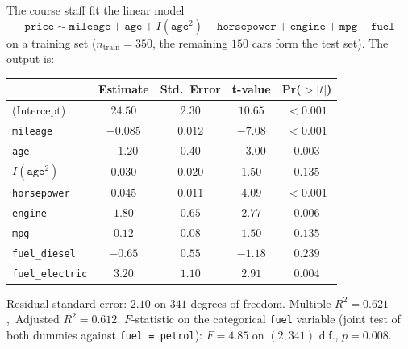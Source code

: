 \documentclass[11pt,a4paper]{article}
\begin{document}
The course staff fit the linear model
$$\texttt{price} \sim \texttt{mileage} + \texttt{age} + I(\texttt{age}^2) + \texttt{horsepower} + \texttt{engine} + \texttt{mpg} + \texttt{fuel}$$
on a training set ($n_\text{train} = 350$, the remaining $150$ cars form the test set). The output is:

\begin{center}\small
\begin{tabular}{lcccc}
\toprule
 & \textbf{Estimate} & \textbf{Std.\ Error} & \textbf{t-value} & \textbf{Pr($>|t|$)} \\
\midrule
(Intercept)    & $24.50$  & $2.30$    & $10.65$  & $<0.001$ \\
\texttt{mileage}        & $-0.085$ & $0.012$   & $-7.08$  & $<0.001$ \\
\texttt{age}            & $-1.20$  & $0.40$    & $-3.00$  & $0.003$ \\
$I(\texttt{age}^2)$     & $0.030$  & $0.020$   & $1.50$   & $0.135$ \\
\texttt{horsepower}     & $0.045$  & $0.011$   & $4.09$   & $<0.001$ \\
\texttt{engine}         & $1.80$   & $0.65$    & $2.77$   & $0.006$ \\
\texttt{mpg}            & $0.12$   & $0.08$    & $1.50$   & $0.135$ \\
\texttt{fuel\_diesel}   & $-0.65$  & $0.55$    & $-1.18$  & $0.239$ \\
\texttt{fuel\_electric} & $3.20$   & $1.10$    & $2.91$   & $0.004$ \\
\bottomrule
\end{tabular}
\end{center}

\noindent Residual standard error: $2.10$ on $341$ degrees of freedom.\quad
Multiple $R^2 = 0.621$,\ Adjusted $R^2 = 0.612$.\quad
$F$-statistic on the categorical \texttt{fuel} variable (joint test of both dummies against \texttt{fuel = petrol}): $F = 4.85$ on $(2, 341)$ d.f., $p = 0.008$.
\end{document}

